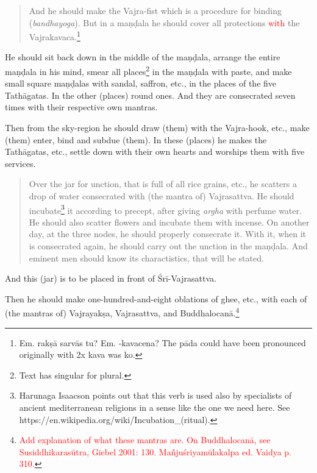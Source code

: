 \documentclass[11pt]{book}
\newcommand{\red}[1]{\textcolor{red}{#1}}
\newcommand{\skt}[1]{\emph{#1}}
\begin{document}
\begin{verse}
And he should make the Vajra-fist which is a procedure for binding (\skt{bandhayoga}). But in a maṇḍala he should cover all protections \red{with} the Vajrakavaca.\footnote{Em. rakṣā sarvās tu? Em. -kavacena? The pāda could have been pronounced originally with 2x kava was ko.}
\end{verse}

He should sit back down in the middle of the maṇḍala, arrange the entire maṇḍala in his mind, smear all places\footnote{Text has singular for plural.} in the maṇḍala with paste, and make small square maṇḍalas with sandal, saffron, etc., in the places of the five Tathāgatas. In the other (places) round ones. And they are consecrated seven times with their respective own mantras.

Then from the sky-region he should draw (them) with the Vajra-hook, etc., make (them) enter, bind and subdue (them). In these (places) he makes the Tathāgatas, etc., settle down with their own hearts and worships them with five services.

\begin{verse}
Over the jar for unction, that is full of all rice grains, etc., he scatters a drop of water consecrated with (the mantra of) Vajrasattva.
	He should incubate\footnote{Harunaga Isaacson points out that this verb is used also by specialists of ancient mediterranean religions in a sense like the one we need here. See https://en.wikipedia.org/wiki/Incubation\_(ritual).} it according to precept, after giving \skt{argha} with perfume water. He should also scatter flowers and incubate them with incense. On another day, at the three nodes, he should properly consecrate it. With it, when it is consecrated again, he should carry out the unction in the maṇḍala. And eminent men should know its charactistics, that will be stated.
\end{verse}

And this (jar) is to be placed in front of Śrī-Vajrasattva.

Then he should make one-hundred-and-eight oblations of ghee, etc., with each of (the mantras of) Vajrayakṣa, Vajrasattva, and Buddhalocanā.\footnote{\red{Add explanation of what these mantras are. On Buddhalocanā, see Susiddhikarasūtra, Giebel 2001: 130. Mañjuśriyamūlakalpa ed. Vaidya p. 310.}}
\end{document}
